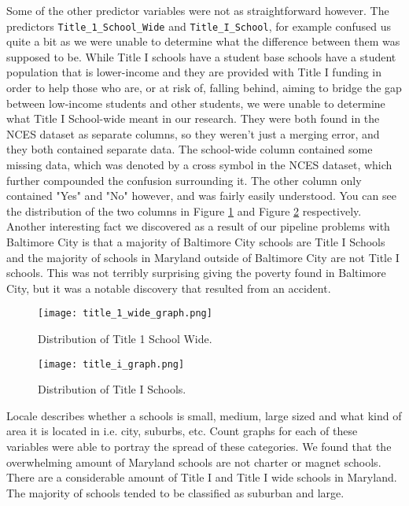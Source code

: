 \documentclass[12pt]{article}
\begin{document}
Some of the other predictor variables were not as straightforward however. The
predictors \texttt{Title\_1\_School\_Wide} and \texttt{Title\_I\_School},
for example confused us quite a bit as we were unable to determine what the 
difference between them was supposed to be. While Title I schools have a student
base schools have a student population that is lower-income and they are provided 
with Title I  funding in order to help those who are, or at risk of, falling behind, 
aiming to bridge the gap between low-income students and other students, we
were unable to determine what Title I School-wide meant in our research. They 
were both found in the NCES dataset as separate columns, so they weren't just a 
merging error, and they both contained separate data.\cite{nces2019} The school-wide 
column contained some missing data, which was denoted by a cross symbol in the 
NCES dataset, which further compounded the confusion surrounding it. The
other column only contained "Yes" and "No" however, and was fairly easily understood.
You can see the distribution of the two columns in Figure \ref{fig:title_1_wide}
and Figure \ref{fig:title_i} respectively.\\

Another interesting fact we discovered as a result of our pipeline problems with
Baltimore City is that a majority of Baltimore City schools are Title I Schools
and the majority of schools in Maryland outside of Baltimore City are not Title
I schools. This was not terribly surprising giving the poverty found in Baltimore
City, but it was a notable discovery that resulted from an accident.\\

\begin{figure}[!htb]
  \centering
  \texttt{[image: title\_1\_wide\_graph.png]}
  \caption{Distribution of Title 1 School Wide.}
  \label{fig:title_1_wide}
\end{figure}

\begin{figure}[!htb]
  \centering
  \texttt{[image: title\_i\_graph.png]}
  \caption{Distribution of Title I Schools.}
  \label{fig:title_i}
\end{figure}

Locale describes 
whether a schools is small, medium, large sized and what kind of area it is located 
in i.e. city, suburbs, etc. Count graphs for each of these variables were able to 
portray the spread of these categories. We found that the overwhelming amount of 
Maryland schools are not charter or magnet schools. There are a considerable amount 
of Title I and Title I wide schools in Maryland. The majority of schools tended to 
be classified as suburban and large.
\end{document}
